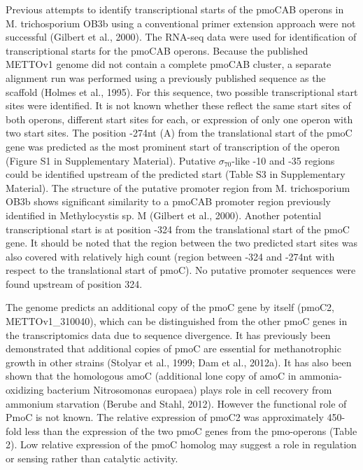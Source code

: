 Previous attempts to identify transcriptional starts of the pmoCAB operons in M. trichosporium OB3b using a conventional primer extension approach were not successful (Gilbert et al., 2000).
The RNA-seq data were used for identification of transcriptional starts for the pmoCAB operons.
Because the published METTOv1 genome did not contain a complete pmoCAB cluster, a separate alignment run was performed using a previously published sequence as the scaffold (Holmes et al., 1995).
For this sequence, two possible transcriptional start sites were identified.
It is not known whether these reflect the same start sites of both operons, different start sites for each, or expression of only one operon with two start sites.
The position -274nt (A) from the translational start of the pmoC gene was predicted as the most prominent start of transcription of the operon (Figure S1 in Supplementary Material).
Putative $\sigma_{70}$-like -10 and -35 regions could be identified upstream of the predicted start (Table S3 in Supplementary Material).
The structure of the putative promoter region from M. trichosporium OB3b shows significant similarity to a pmoCAB promoter region previously identified in Methylocystis sp. M (Gilbert et al., 2000).
Another potential transcriptional start is at position -324 from the translational start of the pmoC gene.
It should be noted that the region between the two predicted start sites was also covered with relatively high count (region between -324 and -274nt with respect to the translational start of pmoC).
No putative promoter sequences were found upstream of position 324.

The genome predicts an additional copy of the pmoC gene by itself (pmoC2, METTOv1\_310040), which can be distinguished from the other pmoC genes in the transcriptomics data due to sequence divergence.
It has previously been demonstrated that additional copies of pmoC are essential for methanotrophic growth in other strains (Stolyar et al., 1999; Dam et al., 2012a).
It has also been shown that the homologous amoC (additional lone copy of amoC in ammonia-oxidizing bacterium Nitrosomonas europaea) plays role in cell recovery from ammonium starvation (Berube and Stahl, 2012).
However the functional role of PmoC is not known.
The relative expression of pmoC2 was approximately 450-fold less than the expression of the two pmoC genes from the pmo-operons (Table 2).
Low relative expression of the pmoC homolog may suggest a role in regulation or sensing rather than catalytic activity.

